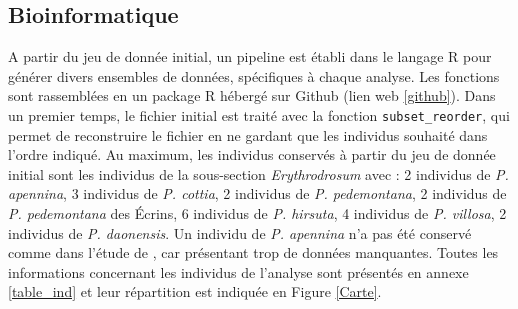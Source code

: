 \subsection{Bioinformatique}

A partir du jeu de donnée initial, un pipeline est établi dans le langage R \citep{RTeam2017} pour générer divers ensembles de données, spécifiques à chaque analyse. Les fonctions sont rassemblées en un package R hébergé sur Github (lien web \ref{github}). Dans un premier temps, le fichier initial est traité avec la fonction \verb|subset_reorder|, qui permet de reconstruire le fichier en ne gardant que les individus souhaité dans l'ordre indiqué. Au maximum, les individus conservés à partir du jeu de donnée initial sont les individus de la sous-section \textit{Erythrodrosum} avec :
2 individus de \textit{P. apennina}, 
3 individus de \textit{P. cottia}, 
2 individus de \textit{P. pedemontana}, 
2 individus de \textit{P. pedemontana} des Écrins, 
6 individus de \textit{P. hirsuta}, 
4 individus de \textit{P. villosa}, 
2 individus de \textit{P. daonensis}.
Un individu de \textit{P. apennina} n'a pas été conservé comme dans l'étude de \citet{Boucher2016a}, car présentant trop de données manquantes. Toutes les informations concernant les individus de l'analyse sont présentés en annexe \ref{table_ind} et leur répartition est indiquée en Figure \ref{Carte}.
 

